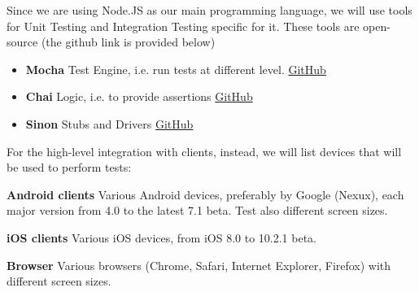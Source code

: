 Since we are using Node.JS as our main programming language, we will use tools for Unit Testing and Integration Testing specific for it.
These tools are open-source (the github link is provided below)
\begin{itemize}
\item \textbf{Mocha} Test Engine, i.e. run tests at different level. \href{https://github.com/mochajs/mocha}{GitHub}
\item \textbf{Chai} Logic, i.e. to provide assertions \href{https://github.com/chaijs/chai}{GitHub}
\item \textbf{Sinon} Stubs and Drivers \href{https://github.com/sinonjs/sinon}{GitHub}
\end{itemize}

\bigbreak
For the high-level integration with clients, instead, we will list devices that will be used to perform tests:
\item \textbf{Android clients} Various Android devices, preferably by Google (Nexux), each major version from 4.0 to the latest 7.1 beta. Test also different screen sizes.
\item \textbf{iOS clients} Various iOS devices, from iOS 8.0 to 10.2.1 beta.
\item \textbf{Browser} Various browsers (Chrome, Safari, Internet Explorer, Firefox) with different screen sizes.